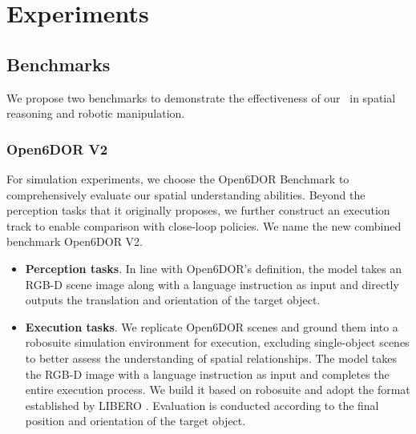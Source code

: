 

\section{Experiments}

\subsection{Benchmarks}
We propose two benchmarks to demonstrate the effectiveness of our \sofar~in spatial reasoning and robotic manipulation.
\subsubsection{Open6DOR V2}
For simulation experiments, we choose the Open6DOR\cite{Open6DOR24} Benchmark to comprehensively evaluate our spatial understanding abilities. 
Beyond the perception tasks that it originally proposes, we further construct an execution track to enable comparison with close-loop policies. 
We name the new combined benchmark Open6DOR V2.
\begin{itemize} 
    \item \textbf{Perception tasks}. In line with Open6DOR's definition, the model takes an RGB-D scene image along with a language instruction as input and directly outputs the translation and orientation of the target object. 
    \item \textbf{Execution tasks}. We replicate Open6DOR scenes and ground them into a robosuite simulation environment for execution, excluding single-object scenes to better assess the understanding of spatial relationships. 
    The model takes the RGB-D image with a language instruction as input and completes the entire execution process. We build it based on robosuite \cite{robosuite2020} and adopt the format established by LIBERO \cite{LIBERO23}. Evaluation is conducted according to the final position and orientation of the target object.
\end{itemize}

